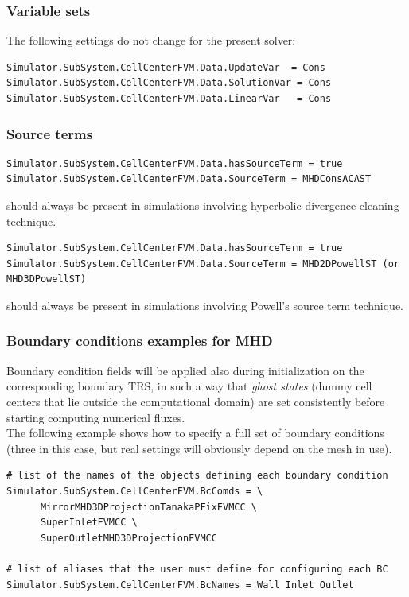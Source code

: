\documentclass[11pt]{article}
\begin{document}
\subsubsection{Variable sets}

The following settings do not change for the present solver:

\begin{lstlisting}[breaklines]
Simulator.SubSystem.CellCenterFVM.Data.UpdateVar  = Cons
Simulator.SubSystem.CellCenterFVM.Data.SolutionVar = Cons
Simulator.SubSystem.CellCenterFVM.Data.LinearVar   = Cons
\end{lstlisting}

\subsubsection{Source terms}

\begin{lstlisting}[breaklines]
Simulator.SubSystem.CellCenterFVM.Data.hasSourceTerm = true
Simulator.SubSystem.CellCenterFVM.Data.SourceTerm = MHDConsACAST
\end{lstlisting}
should always be present in simulations involving hyperbolic divergence cleaning technique. 

\begin{lstlisting}[breaklines]
Simulator.SubSystem.CellCenterFVM.Data.hasSourceTerm = true
Simulator.SubSystem.CellCenterFVM.Data.SourceTerm = MHD2DPowellST (or MHD3DPowellST) 
\end{lstlisting}
should always be present in simulations involving Powell's source term technique.

\subsubsection{Boundary conditions examples for MHD}

Boundary condition fields will be applied also during initialization on the corresponding boundary TRS,
in such a way that {\it ghost states} (dummy cell centers that lie outside the computational domain) are set 
consistently before starting computing numerical fluxes. \\
The following example shows how to specify a full set of boundary conditions (three in this case, but 
real settings will obviously depend on the mesh in use).

\begin{lstlisting}[breaklines]
# list of the names of the objects defining each boundary condition
Simulator.SubSystem.CellCenterFVM.BcComds = \
      MirrorMHD3DProjectionTanakaPFixFVMCC \
      SuperInletFVMCC \
      SuperOutletMHD3DProjectionFVMCC

# list of aliases that the user must define for configuring each BC
Simulator.SubSystem.CellCenterFVM.BcNames = Wall Inlet Outlet
\end{lstlisting}
\end{document}
